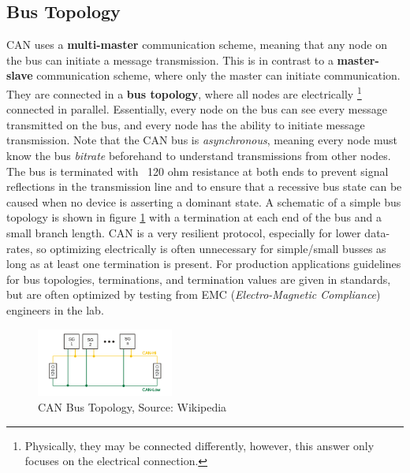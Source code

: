 \documentclass[main.tex]{subfiles}
\begin{document}
\subsection{Bus Topology}
CAN uses a \textbf{multi-master} communication scheme, meaning that any node on the bus can initiate a message transmission. This is in contrast to a \textbf{master-slave} communication scheme, where only the master can initiate communication. They are connected in a \textbf{bus topology}, where all nodes are electrically \footnote{Physically, they may be connected differently, however, this answer only focuses on the electrical connection.} connected in parallel. Essentially, every node on the bus can see every message transmitted on the bus, and every node has the ability to initiate message transmission. Note that the CAN bus is \textit{asynchronous}, meaning every node must know the bus \textit{bitrate} beforehand to understand transmissions from other nodes.
\newline
\newnoindentpara
The bus is terminated with ~120 ohm resistance at both ends to prevent signal reflections in the transmission line and to ensure that a recessive bus state can be caused when no device is asserting a dominant state. A schematic of a simple bus topology is shown in figure \ref{fig:bus-topology} with a termination at each end of the bus and a small branch length. CAN is a very resilient protocol, especially for lower data-rates, so optimizing electrically is often unnecessary for simple/small busses as long as at least one termination is present. For production applications guidelines for bus topologies, terminations, and termination values are given in standards, but are often optimized by testing from EMC (\textit{Electro-Magnetic Compliance}) engineers in the lab.

\begin{figure}[H]
    \centering
    \includegraphics[width=0.4\textwidth]{images/wikipedia_can_bus_topology.png}
    \caption{CAN Bus Topology, Source: Wikipedia \cite{wikipedia_can_bus_image}}
    \label{fig:bus-topology}
\end{figure}
\end{document}
